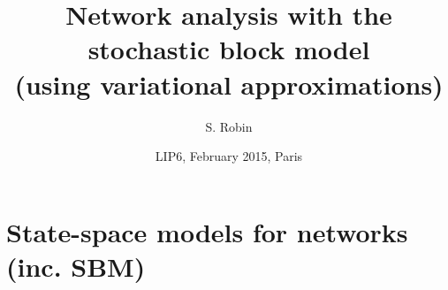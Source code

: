 \documentclass[10pt]{beamer}
\newcommand{\fignet}{../FIGURES}
\begin{document}

\title[Network analysis with SBM]{Network analysis with the stochastic block model \\ {\large (using variational approximations)}}

\author{S. Robin}


\date[LIP6, Paris]{LIP6, February 2015, Paris}

\maketitle


% 

\section[State-space models for networks]{State-space models for networks (inc. SBM)}
\end{document}

